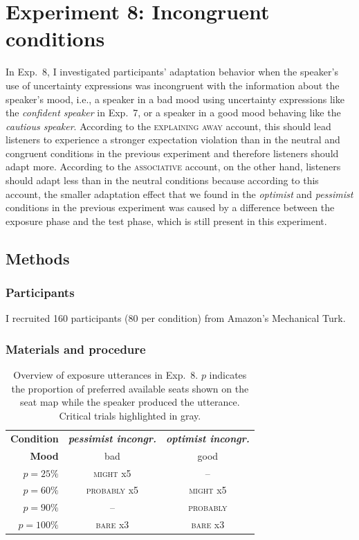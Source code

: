 \section{Experiment 8: Incongruent conditions}

In Exp.~8, I investigated participants' adaptation behavior when the speaker's use of uncertainty expressions was incongruent with the information about the speaker's mood, i.e., a speaker in a bad mood using uncertainty expressions like the \textit{confident speaker} in Exp.~7, or a speaker in a good mood behaving like the \textit{cautious speaker}. According to the \textsc{explaining away} account, this should lead listeners to experience a stronger expectation violation than in the neutral and congruent conditions in the previous experiment and therefore listeners should adapt more.  According to the \textsc{associative} account, on the other hand, listeners should adapt less than in the neutral conditions because according to this account, the smaller adaptation effect that we found in the \textit{optimist} and \textit{pessimist} conditions in the previous experiment was caused by a difference between the exposure phase and the test phase, which is still present in this experiment.


\subsection{Methods}

\subsubsection{Participants} I recruited 160 participants (80 per condition) from Amazon's Mechanical Turk.

\subsubsection{Materials and procedure}

\begin{table}
\centering
\begin{tabular}{r|c | c }
\toprule 
     \textbf{Condition} & \textit{\textbf{pessimist incongr.}} & \textit{\textbf{optimist incongr.}} \\
     \textbf{Mood} & bad  & good  \\ \midrule
     $p=25\%$ & \textsc{might} x5 & -- \\
     \cellcolor{LightGray} $p=60\%$ &  \cellcolor{LightGray} \textsc{probably} x5 & \cellcolor{LightGray} \textsc{might} x5 \\
     $p=90\%$ & -- &  \textsc{probably}  \\
     $p=100\%$ & {\textsc{bare} x3} & {\textsc{bare} x3} \\
     \bottomrule
\end{tabular}
\caption{Overview of exposure utterances in Exp.~8. $p$ indicates the proportion of preferred available seats shown on the seat map while the speaker produced the utterance. Critical trials highlighted in gray.\label{tbl:exposure-overview-exp8}}
\end{table}


